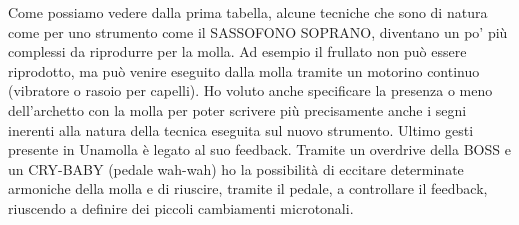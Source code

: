 Come possiamo vedere dalla prima tabella, alcune tecniche che sono di natura come per uno strumento come il SASSOFONO SOPRANO, diventano un po’ più complessi da riprodurre per la molla. Ad esempio il frullato non può essere riprodotto, ma può venire eseguito dalla molla tramite un motorino continuo (vibratore o rasoio per capelli). 
Ho voluto anche specificare la presenza o meno dell’archetto con la molla per poter scrivere più precisamente anche i segni inerenti alla natura della tecnica eseguita sul nuovo strumento.
Ultimo gesti presente in Unamolla è legato al suo feedback. Tramite un overdrive della BOSS e un CRY-BABY (pedale wah-wah) ho la possibilità di eccitare determinate armoniche della molla e di riuscire, tramite il pedale, a controllare il feedback, riuscendo a definire dei piccoli cambiamenti microtonali.





